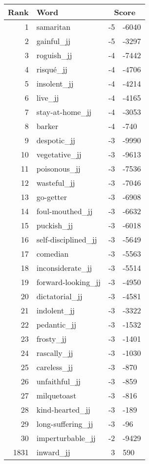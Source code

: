 \begin{longtable}[!htbp]{| rlr@{.}l |}
    \hline
    \textbf{Rank} & \textbf{Word} & \multicolumn{2}{c|}{\textbf{Score}} \\
    \hline
    \endhead
    1 & samaritan & -5 & -6040 \\
    2 & gainful\_jj & -5 & -3297 \\
    3 & roguish\_jj & -4 & -7442 \\
    4 & risqué\_jj & -4 & -4706 \\
    5 & insolent\_jj & -4 & -4214 \\
    6 & live\_jj & -4 & -4165 \\
    7 & stay-at-home\_jj & -4 & -3053 \\
    8 & barker & -4 & -740 \\
    9 & despotic\_jj & -3 & -9990 \\
    10 & vegetative\_jj & -3 & -9613 \\
    11 & poisonous\_jj & -3 & -7536 \\
    12 & wasteful\_jj & -3 & -7046 \\
    13 & go-getter & -3 & -6908 \\
    14 & foul-mouthed\_jj & -3 & -6632 \\
    15 & puckish\_jj & -3 & -6018 \\
    16 & self-disciplined\_jj & -3 & -5649 \\
    17 & comedian & -3 & -5563 \\
    18 & inconsiderate\_jj & -3 & -5514 \\
    19 & forward-looking\_jj & -3 & -4950 \\
    20 & dictatorial\_jj & -3 & -4581 \\
    21 & indolent\_jj & -3 & -3322 \\
    22 & pedantic\_jj & -3 & -1532 \\
    23 & frosty\_jj & -3 & -1401 \\
    24 & rascally\_jj & -3 & -1030 \\
    25 & careless\_jj & -3 & -870 \\
    26 & unfaithful\_jj & -3 & -859 \\
    27 & milquetoast & -3 & -816 \\
    28 & kind-hearted\_jj & -3 & -189 \\
    29 & long-suffering\_jj & -3 & -96 \\
    30 & imperturbable\_jj & -2 & -9429 \\
    1831 & inward\_jj & 3 & 590 \\

\end{longtable}
